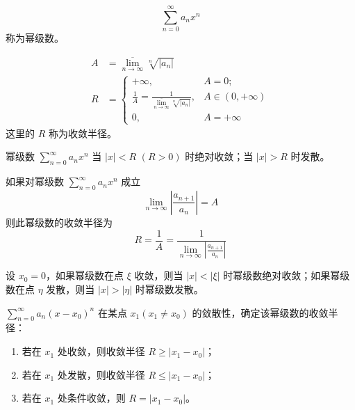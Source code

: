 \documentclass{ctexbook}
\begin{document}
\begin{definition}[幂级数]
    \begin{equation}
        \sum_{n=0}^\infty a_nx^n
    \end{equation}
    称为幂级数。
\end{definition}

\begin{definition}[收敛半径]
    \begin{align}
        A&=\overline{\lim_{n\rightarrow\infty}}\sqrt[n]{|a_n|}\\
        R&=\begin{cases}
            +\infty,&A=0;\\
            \frac{1}{A}=\frac{1}{\overline{\lim_{n\rightarrow\infty}}\sqrt[n]{|a_n|}},&A\in (0,+\infty)\\
            0,&A=+\infty
        \end{cases}
    \end{align}
    这里的 $R$ 称为收敛半径。
\end{definition}

\begin{theorem}
    幂级数 $\sum_{n=0}^\infty a_nx^n$ 当 $|x|<R$ $(R>0)$ 时绝对收敛；当 $|x|>R$ 时发散。
\end{theorem}

\begin{theorem}
    如果对幂级数 $\sum_{n=0}^\infty a_nx^n$ 成立
    \begin{equation}
        \lim_{n\rightarrow\infty}\left|\frac{a_{n+1}}{a_n}\right|=A
    \end{equation}
    则此幂级数的收敛半径为
    \begin{equation}
        R=\frac{1}{A}=\frac{1}{\lim_{n\rightarrow\infty}\left|\frac{a_{n+1}}{a_n}\right|}
    \end{equation}
\end{theorem}

\begin{theorem}[Abel 定理]
    设 $x_0=0$，如果幂级数在点 $\xi$ 收敛，则当 $|x|<|\xi|$ 时幂级数绝对收敛；如果幂级数在点 $\eta$ 发散，则当 $|x|>|\eta|$ 时幂级数发散。
\end{theorem}

\begin{corollary}[条件收敛的推论]
    $\sum_{n=0}^\infty a_n(x-x_0)^n$ 在某点 $x_1(x_1\neq x_0)$ 的敛散性，确定该幂级数的收敛半径：
    \begin{enumerate}
        \item 若在 $x_1$ 处收敛，则收敛半径 $R\geq |x_1-x_0|$；
        \item 若在 $x_1$ 处发散，则收敛半径 $R\leq |x_1-x_0|$；
        \item 若在 $x_1$ 处条件收敛，则 $R=|x_1-x_0|$。
    \end{enumerate}
\end{corollary}
\end{document}
